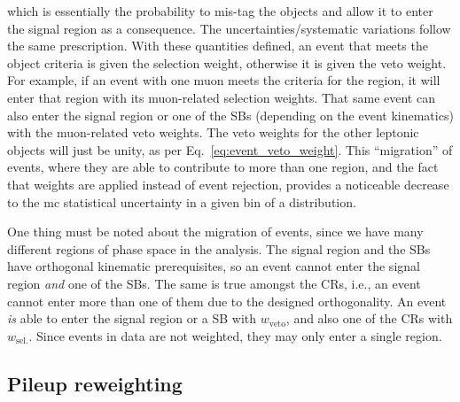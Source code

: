 which is essentially the probability to mis-tag the objects and allow it to enter the signal region as a consequence. The uncertainties/systematic variations follow the same prescription. With these quantities defined, an event that meets the object criteria is given the selection weight, otherwise it is given the veto weight. For example, if an event with one muon meets the criteria for the \singleMuCr region, it will enter that region with its muon-related selection weights. That same event can also enter the signal region or one of the \glspl{SB} (depending on the event kinematics) with the muon-related veto weights. The veto weights for the other leptonic objects will just be unity, as per Eq.~\ref{eq:event_veto_weight}. This ``migration'' of events, where they are able to contribute to more than one region, and the fact that weights are applied instead of event rejection, provides a noticeable decrease to the \acrlong{mc} statistical uncertainty in a given bin of a distribution.

One thing must be noted about the migration of events, since we have many different regions of phase space in the analysis. The signal region and the \glspl{SB} have orthogonal kinematic prerequisites, so an event cannot enter the signal region \emph{and} one of the \glspl{SB}. The same is true amongst the \glspl{CR}, i.e., an event cannot enter more than one of them due to the designed orthogonality. An event \emph{is} able to enter the signal region or a \gls{SB} with $w_{\mathrm{veto}}$, and also one of the \glspl{CR} with $w_{\mathrm{sel.}}$. Since events in data are not weighted, they may only enter a single region.





\subsection{Pileup reweighting}
\label{subsec:pu_reweighting}

